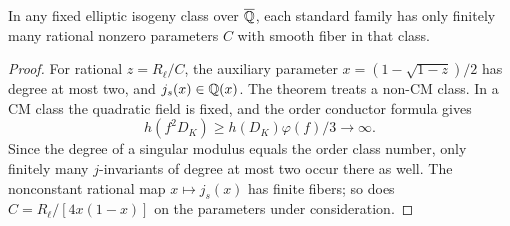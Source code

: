 \begin{corollary}
In any fixed elliptic isogeny class over $\overline{\mathbb Q}$, each standard
family has only finitely many rational nonzero parameters $C$ with
smooth fiber in that class.
\end{corollary}
\begin{proof}
For rational $z=R_\ell/C$, the auxiliary parameter
$x=(1-\sqrt{1-z})/2$ has degree at most two, and $j_s(x)\in\mathbb Q(x)$.
The theorem treats a non-CM class. In a CM class the quadratic field is
fixed, and the order conductor formula gives
\[
                 h(f^2D_K)\ge h(D_K)\varphi(f)/3\longrightarrow\infty.
\]
Since the degree of a singular modulus equals the order class number,
only finitely many $j$-invariants of degree at most two occur there as
well. The nonconstant rational map $x\mapsto j_s(x)$ has finite fibers;
so does $C=R_\ell/[4x(1-x)]$ on the parameters under consideration.
\end{proof}
